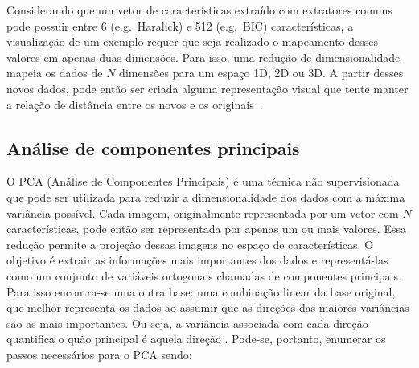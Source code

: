 Considerando que um vetor de características extraído com extratores comuns pode possuir entre 6 (e.g.\ Haralick) e 512 (e.g.\ BIC) características, a visualização de um exemplo requer que seja realizado o mapeamento desses valores em apenas duas dimensões. Para isso, uma redução de dimensionalidade mapeia os dados de $N$ dimensões para um espaço 1D, 2D ou 3D. A partir desses novos dados, pode então ser criada alguma representação visual que tente manter a relação de distância entre os novos e os originais~\cite{Paulovich2007}.

\subsection{Análise de componentes principais}
\label{sec:pca}


O PCA (Análise de Componentes Principais) é uma técnica não supervisionada que pode ser utilizada para reduzir a dimensionalidade dos dados com a máxima variância possível. Cada imagem, originalmente representada por um vetor com $N$ características, pode então ser representada por apenas um ou mais valores. Essa redução permite a projeção dessas imagens no espaço de características. O objetivo é extrair as informações mais importantes dos dados e representá-las como um conjunto de variáveis ortogonais chamadas de componentes principais. Para isso encontra-se uma outra base: uma combinação linear da base original, que melhor representa os dados ao assumir que as direções das maiores variâncias são as mais importantes. Ou seja, a variância associada com cada direção quantifica o quão principal é aquela direção \cite{Abdi2010}. Pode-se, portanto, enumerar os passos necessários para o PCA sendo:


